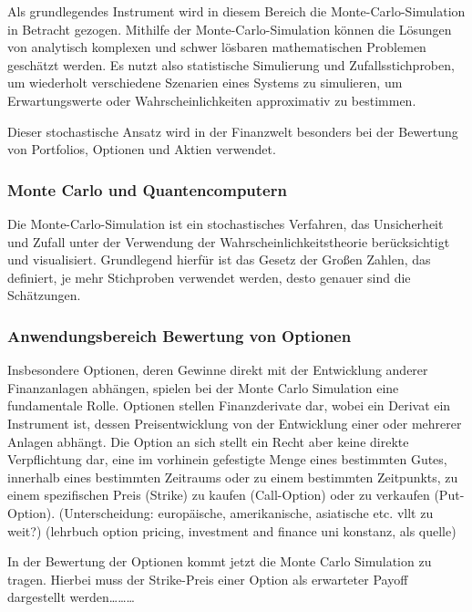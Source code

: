 Als grundlegendes Instrument wird in diesem Bereich die Monte-Carlo-Simulation in Betracht gezogen. Mithilfe der Monte-Carlo-Simulation können die Lösungen von analytisch komplexen und schwer lösbaren mathematischen Problemen geschätzt werden. Es nutzt also statistische Simulierung und Zufallsstichproben, um wiederholt verschiedene Szenarien eines Systems zu simulieren, um Erwartungswerte oder Wahrscheinlichkeiten approximativ zu bestimmen.
 
Dieser stochastische Ansatz wird in der Finanzwelt besonders bei der Bewertung von Portfolios, Optionen und Aktien verwendet.

\subsubsection*{Monte Carlo und Quantencomputern}
Die Monte-Carlo-Simulation ist ein stochastisches Verfahren, das Unsicherheit und Zufall unter der Verwendung der Wahrscheinlichkeitstheorie berücksichtigt und visualisiert. Grundlegend hierfür ist das Gesetz der Großen Zahlen, das definiert, je mehr Stichproben verwendet werden, desto genauer sind die Schätzungen. 

\subsubsection*{Anwendungsbereich Bewertung von Optionen}
Insbesondere Optionen, deren Gewinne direkt mit der Entwicklung anderer Finanzanlagen abhängen, spielen bei der Monte Carlo Simulation eine fundamentale Rolle. 
Optionen stellen Finanzderivate dar, wobei ein Derivat ein Instrument ist, dessen Preisentwicklung von der Entwicklung einer oder mehrerer Anlagen abhängt. Die Option an sich stellt ein Recht aber keine direkte Verpflichtung dar, eine im vorhinein gefestigte Menge eines bestimmten Gutes, innerhalb eines bestimmten Zeitraums oder zu einem bestimmten Zeitpunkts, zu einem spezifischen Preis (Strike) zu kaufen (Call-Option) oder zu verkaufen (Put-Option). 
(Unterscheidung: europäische, amerikanische, asiatische etc. vllt zu weit?)
(lehrbuch option pricing, investment and finance uni konstanz, als quelle)
 
In der Bewertung der Optionen kommt jetzt die Monte Carlo Simulation zu tragen. Hierbei muss der Strike-Preis einer Option als erwarteter Payoff dargestellt werden………

